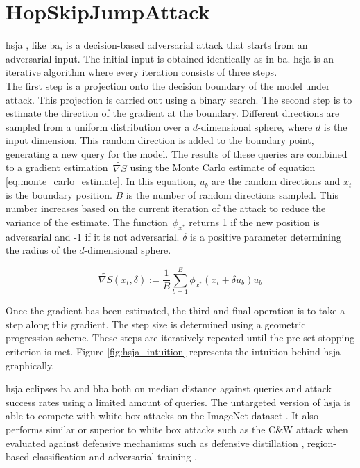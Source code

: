 \section{HopSkipJumpAttack}\label{sec:hsja}
\gls{hsja} \cite{hsja}, like \gls{ba}, is a decision-based adversarial attack that starts from an adversarial input. The initial input is obtained identically as in \gls{ba}. \gls{hsja} is an iterative algorithm where every iteration consists of three steps.\\

The first step is a projection onto the decision boundary of the model under attack. This projection is carried out using a binary search. The second step is to estimate the direction of the gradient at the boundary. Different directions are sampled from a uniform distribution over a $d$-dimensional sphere, where $d$ is the input dimension. This random direction is added to the boundary point, generating a new query for the model. The results of these queries are combined to a gradient estimation~$\widetilde{\nabla S}$ using the Monte Carlo estimate of equation \ref{eq:monte_carlo_estimate}. In this equation, $u_b$ are the random directions and $x_t$ is the boundary position. $B$ is the number of random directions sampled. This number increases based on the current iteration of the attack to reduce the variance of the estimate. The function~$\phi_{x^*}$ returns 1 if the new position is adversarial and -1 if it is not adversarial. $\delta$ is a positive parameter determining the radius of the $d$-dimensional sphere.

\begin{equation}\label{eq:monte_carlo_estimate}
\widetilde{\nabla S}(x_t,\delta) := \frac{1}{B} \sum_{b=1}^{B}\phi_{x^*}(x_t + \delta u_b)u_b
\end{equation}

\begin{minipage}{\textwidth}
Once the gradient has been estimated, the third and final operation is to take a step along this gradient. The step size is determined using a geometric progression scheme. These steps are iteratively repeated until the pre-set stopping criterion is met. Figure \ref{fig:hsja_intuition} represents the intuition behind \gls{hsja} graphically.\\
\end{minipage}


\gls{hsja} eclipses \gls{ba} and \gls{bba} both on median distance against queries and attack success rates using a limited amount of queries. The untargeted version of \gls{hsja} is able to compete with white-box attacks on the ImageNet dataset \cite{imagenet}. It also performs similar or superior to white box attacks such as the C\&W attack \cite{cw_attack} when evaluated against defensive mechanisms such as defensive distillation \cite{defensive_distillation}, region-based classification \cite{region-based_classification} and adversarial training \cite{FGSM}.



